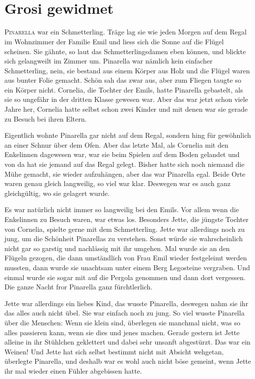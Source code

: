 \chapter*{{}\\\small \color{DeepPink} Grosi gewidmet}
\lettrine[lines=3]{\color{DeepPink}P}{inarella} war ein Schmetterling. Träge lag sie wie jeden Morgen auf dem Regal im Wohnzimmer der Familie Emil und liess sich die Sonne auf die Flügel scheinen. Sie gähnte, so laut das Schmetterlingsdamen eben können, und blickte sich gelangweilt im Zimmer um. Pinarella war nämlich kein einfacher Schmetterling, nein, sie bestand aus einem Körper aus Holz und die Flügel waren aus bunter Folie gemacht. Schön sah das zwar aus, aber zum Fliegen taugte so ein Körper nicht. Cornelia, die Tochter der Emils, hatte Pinarella gebastelt, als sie so ungefähr in der dritten Klasse gewesen war. Aber das war jetzt schon viele Jahre her, Cornelia hatte selbst schon zwei Kinder und mit denen war sie gerade zu Besuch bei ihren Eltern. 

Eigentlich wohnte Pinarella gar nicht auf dem Regal, sondern hing für gewöhnlich an einer Schnur über dem Ofen. Aber das letzte Mal, als Cornelia mit den Enkelinnen dagewesen war, war sie beim Spielen auf dem Boden gelandet und von da hat sie jemand auf das Regal gelegt. Bisher hatte sich noch niemand die Mühe gemacht, sie wieder aufzuhängen, aber das war Pinarella egal. Beide Orte waren genau gleich langweilig, so viel war klar. Deswegen war es auch ganz gleichgültig, wo sie gelagert wurde.

Es war natürlich nicht immer so langweilig bei den Emils. Vor allem wenn die Enkelinnen zu Besuch waren, war etwas los. Besonders Jette, die jüngste Tochter von Cornelia, spielte gerne mit dem Schmetterling. Jette war allerdings noch zu jung, um die Schönheit Pinarellas zu verstehen. Sonst würde sie wahrscheinlich nicht gar so garstig und nachlässig mit ihr umgehen. Mal wurde sie an den Flügeln gezogen, die dann umständlich von Frau Emil wieder festgeleimt werden mussten, dann wurde sie unachtsam unter einem Berg Legosteine vergraben. Und einmal wurde sie sogar mit auf die Pergola genommen und dann dort vergessen. Die ganze Nacht fror Pinarella ganz fürchtlerlich.

Jette war allerdings ein liebes Kind, das wusste Pinarella, deswegen nahm sie ihr das alles auch nicht übel. Sie war einfach noch zu jung. So viel wusste Pinarella über die Menschen: Wenn sie klein sind, überlegen sie manchmal nicht, was so alles passieren kann, wenn sie dies und jenes machen. Gerade gestern ist Jette alleine in ihr Stühlchen geklettert und dabei sehr unsanft abgestürzt. Das war ein Weinen! Und Jette hat sich selbst bestimmt nicht mit Absicht wehgetan, überlegte Pinarella, und deshalb war es wohl auch nicht böse gemeint, wenn Jette ihr mal wieder einen Fühler abgebissen hatte.

